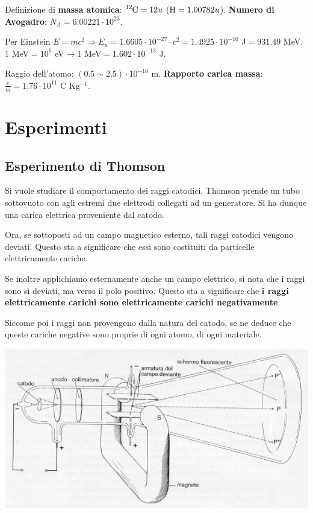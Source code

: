 \documentclass[a4paper,11pt,twoside,openany]{book}
\theoremstyle{definition}
\theoremstyle{plain}
\theoremstyle{plain}
\theoremstyle{definition}
\begin{document}
Definizione di \textbf{massa atomica}: $\ce{^{12}C}=12 u$ ($\ce{H}=1.00782 u$). \textbf{Numero di Avogadro}: $N_A=6.00221\cdot 10^{23}$.

Per Einstein $E=mc^2 \Longrightarrow E_u=1.6605\cdot 10^{-27}\cdot c^2=1.4925\cdot 10^{-10}$ J$=931.49$ MeV. $1$ MeV$=10^6$ eV$ \rightarrow 1$ MeV$=1.602\cdot 10^{-13}$ J.

Raggio dell'atomo: $\left(0.5 \sim 2.5\right)\cdot 10^{-10}$ m. \textbf{Rapporto carica massa}: $\frac{e}{m}=1.76\cdot 10^{11}$ C Kg$^{-1}$.

\chapter{Esperimenti} %
\section{Esperimento di Thomson} %
Si vuole studiare il comportamento dei raggi catodici. Thomson prende un tubo sottovuoto con agli estremi due elettrodi collegati ad un generatore. Si ha dunque una carica elettrica proveniente dal catodo.

Ora, se sottoposti ad un campo magnetico esterno, tali raggi catodici vengono deviati. Questo sta a significare che essi sono costituiti da particelle elettricamente cariche.

Se inoltre applichiamo esternamente anche un campo elettrico, si nota che i raggi sono sì deviati, ma verso il polo positivo. Questo sta a significare che \textbf{i raggi elettricamente carichi sono elettricamente carichi negativamente}.

Siccome poi i raggi non provengono dalla natura del catodo, se ne deduce che queste cariche negative sono proprie di ogni atomo, di ogni materiale. 

\begin{center}
\includegraphics[width=\textwidth]{immagini/thompson.jpg} %
\end{center}
\end{document}
